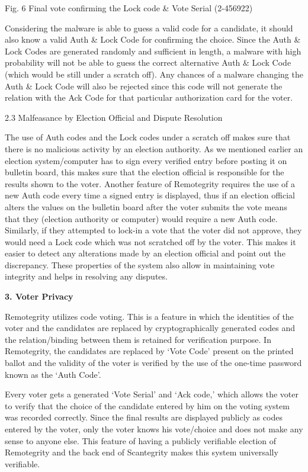 \bigskip


Fig. 6 Final vote confirming the Lock code \& Vote Serial (2-456922)

Considering the malware is able to guess a valid code for a candidate, it should also know a valid Auth \& Lock Code for confirming the choice. Since the Auth \& Lock Codes are generated randomly and sufficient in length, a malware with high probability will not be able to guess the correct alternative Auth \& Lock Code (which would be still under a scratch off). Any chances of a malware changing the Auth \& Lock Code will also be rejected since this code will not generate the relation with the Ack Code for that particular authorization card for the voter.

2.3 Malfeasance by Election Official and Dispute Resolution

The use of Auth codes and the Lock codes under a scratch off makes sure that there is no malicious activity by an election authority. As we mentioned earlier an election system/computer has to sign every verified entry before posting it on bulletin board, this makes sure that the election official is responsible for the results shown to the voter. Another feature of Remotegrity requires the use of a new Auth code every time a signed entry is displayed, thus if an election official alters the values on the bulletin board after the voter submits the vote means that they (election authority or computer) would require a new Auth code. Similarly, if they attempted to lock-in a vote that the voter did not approve, they would need a Lock code which was not scratched off by the voter. This makes it easier to detect any alterations made by an election official and point out the discrepancy. These properties of the system also allow in maintaining vote integrity and helps in resolving any disputes.

\textbf{3. Voter Privacy}

Remotegrity utilizes code voting. This is a feature in which the identities of the voter and the candidates are replaced by cryptographically generated codes and the relation/binding between them is retained for verification purpose. In Remotegrity, the candidates are replaced by `Vote Code' present on the printed ballot and the validity of the voter is verified by the use of the one-time password known as the `Auth Code'.

Every voter gets a generated `Vote Serial' and `Ack code,' which allows the voter to verify that the choice of the candidate entered by him on the voting system was recorded correctly. Since the final results are displayed publicly as codes entered by the voter, only the voter knows his vote/choice and does not make any sense to anyone else. This feature of having a publicly verifiable election of Remotegrity and the back end of Scantegrity makes this system universally verifiable.

